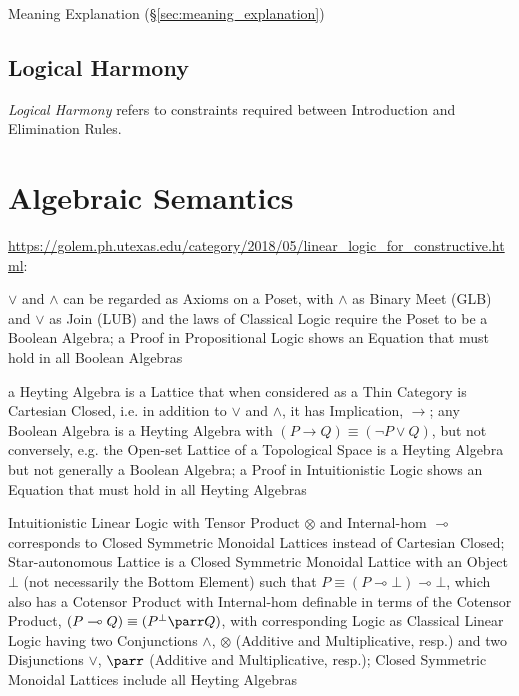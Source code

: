 Meaning Explanation (\S\ref{sec:meaning_explanation})



\subsection{Logical Harmony} \label{sec:logical_harmony}

\emph{Logical Harmony} refers to constraints required between
Introduction and Elimination Rules.



\section{Algebraic Semantics}\label{sec:algebraic_semantics}

\url{https://golem.ph.utexas.edu/category/2018/05/linear_logic_for_constructive.html}:

$\vee$ and $\wedge$ can be regarded as Axioms on a Poset, with $\wedge$ as
Binary Meet (GLB) and $\vee$ as Join (LUB) and the laws of Classical Logic
require the Poset to be a Boolean Algebra; a Proof in Propositional Logic shows
an Equation that must hold in all Boolean Algebras

a Heyting Algebra is a Lattice that when considered as a Thin Category is
Cartesian Closed, i.e. in addition to $\vee$ and $\wedge$, it has Implication,
$\rightarrow$; any Boolean Algebra is a Heyting Algebra with $(P \rightarrow Q)
\equiv (\neg{P}\vee{Q})$, but not conversely, e.g. the Open-set Lattice of a
Topological Space is a Heyting Algebra but not generally a Boolean Algebra; a
Proof in Intuitionistic Logic shows an Equation that must hold in all Heyting
Algebras

Intuitionistic Linear Logic with Tensor Product $\otimes$ and Internal-hom
$\multimap$ corresponds to Closed Symmetric Monoidal Lattices instead of
Cartesian Closed; Star-autonomous Lattice is a Closed Symmetric Monoidal
Lattice with an Object $\bot$ (not necessarily the Bottom Element) such that $P
\equiv (P \multimap \bot) \multimap \bot$, which also has a Cotensor Product
with Internal-hom definable in terms of the Cotensor Product, $(P \multimap Q)
\equiv (P^\bot \parr Q)$, with corresponding Logic as Classical Linear Logic
having two Conjunctions $\wedge$, $\otimes$ (Additive and Multiplicative,
resp.) and two Disjunctions $\vee$, $\parr$ (Additive and Multiplicative,
resp.); Closed Symmetric Monoidal Lattices include all Heyting Algebras

